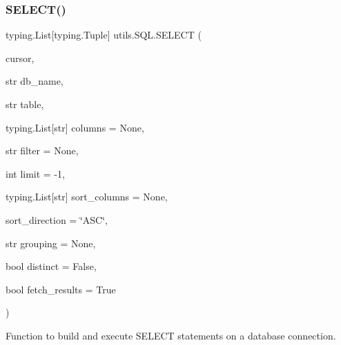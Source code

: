 \subsubsection{\texorpdfstring{SELECT()}{SELECT()}}
{\footnotesize\ttfamily  typing.\+List\mbox{[}typing.\+Tuple\mbox{]} utils.\+S\+Q\+L.\+S\+E\+L\+E\+CT (\begin{DoxyParamCaption}\item[{}]{cursor,  }\item[{str}]{db\+\_\+name,  }\item[{str}]{table,  }\item[{typing.\+List\mbox{[}str\mbox{]} }]{columns = {\ttfamily None},  }\item[{str }]{filter = {\ttfamily None},  }\item[{int }]{limit = {\ttfamily -\/1},  }\item[{typing.\+List\mbox{[}str\mbox{]} }]{sort\+\_\+columns = {\ttfamily None},  }\item[{}]{sort\+\_\+direction = {\ttfamily \char`\"{}ASC\char`\"{}},  }\item[{str }]{grouping = {\ttfamily None},  }\item[{bool }]{distinct = {\ttfamily False},  }\item[{bool }]{fetch\+\_\+results = {\ttfamily True} }\end{DoxyParamCaption})\hspace{0.3cm}{\ttfamily [static]}}



Function to build and execute S\+E\+L\+E\+CT statements on a database connection. 


